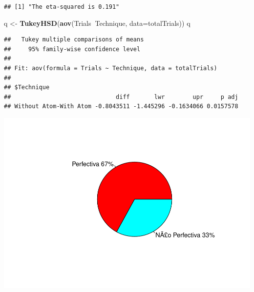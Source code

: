 \documentclass[]{article}
\newenvironment{Shaded}{\begin{snugshade}}{\end{snugshade}}
\newcommand{\CommentTok}[1]{\textcolor[rgb]{0.56,0.35,0.01}{\textit{#1}}}
\newcommand{\DataTypeTok}[1]{\textcolor[rgb]{0.13,0.29,0.53}{#1}}
\newcommand{\DecValTok}[1]{\textcolor[rgb]{0.00,0.00,0.81}{#1}}
\newcommand{\KeywordTok}[1]{\textcolor[rgb]{0.13,0.29,0.53}{\textbf{#1}}}
\newcommand{\NormalTok}[1]{#1}
\newcommand{\OperatorTok}[1]{\textcolor[rgb]{0.81,0.36,0.00}{\textbf{#1}}}
\newcommand{\StringTok}[1]{\textcolor[rgb]{0.31,0.60,0.02}{#1}}
\begin{document}
\begin{verbatim}
## [1] "The eta-squared is 0.191"
\end{verbatim}

\begin{Shaded}
\begin{Highlighting}[]
\NormalTok{q <-}\StringTok{ }\KeywordTok{TukeyHSD}\NormalTok{(}\KeywordTok{aov}\NormalTok{(Trials}\OperatorTok{~}\NormalTok{Technique, }\DataTypeTok{data=}\NormalTok{totalTrials))}
\NormalTok{q}
\end{Highlighting}
\end{Shaded}

\begin{verbatim}
##   Tukey multiple comparisons of means
##     95% family-wise confidence level
## 
## Fit: aov(formula = Trials ~ Technique, data = totalTrials)
## 
## $Technique
##                              diff       lwr        upr     p adj
## Without Atom-With Atom -0.8043511 -1.445296 -0.1634066 0.0157578
\end{verbatim}

\begin{Shaded}
\end{Shaded}

\includegraphics{main_files/figure-latex/unnamed-chunk-38-1.pdf}
\end{document}

